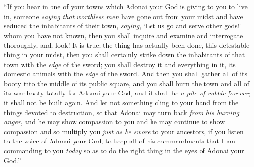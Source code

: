 \begin{biblechapter}
\verse “If you hear in one of your towns which Adonai your God is giving to you to live in, someone \textit{saying that}
\verse \textit{worthless men} have gone out from your midst and have seduced the inhabitants of their town, \textit{saying}, ‘Let us go and serve other gods!’ whom you have not known,
\verse then you shall inquire and examine and interrogate thoroughly, and, look! It is true; the thing has actually been done, this detestable thing in your midst,
\verse then you shall certainly strike down the inhabitants of that town with the \textit{edge} of the sword; you shall destroy it and everything in it, its domestic animals with the \textit{edge} of the sword.
\verse And then you shall gather all of its booty into the middle of its public square, and you shall burn the town and all of its war-booty totally for Adonai your God, and it shall be \textit{a pile of rubble forever}; it shall not be built again.
\verse And let not something cling to your hand from the things devoted to destruction, so that Adonai may turn back \textit{from his burning anger}, and he may show compassion to you and he may continue to show compassion and so multiply you \textit{just as he swore} to your ancestors,
\verse if you listen to the voice of Adonai your God, to keep all of his commandments that I am commanding to you \textit{today} so as to do the right thing in the eyes of Adonai your God.”
\end{biblechapter}

